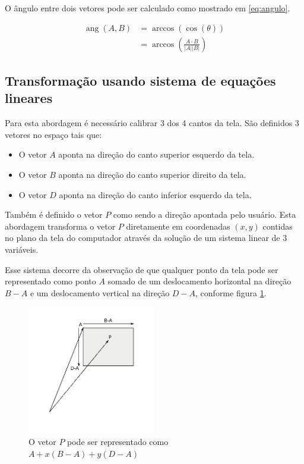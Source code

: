 \documentclass[brazil,pagestart=firstchapter]{abnt}
\DeclareMathOperator{\angulo}{ang}
\begin{document}
O ângulo entre dois vetores pode ser calculado como mostrado em
\eqref{eq:angulo}.

\begin{align}
\label{eq:angulo}
\angulo(A,B) & = \arccos( \cos(\theta) )    \\
             & = \arccos\left( \frac{A \cdot B}{|A||B|} \right)  \nonumber
\end{align}


\subsection{Transformação usando sistema de equações lineares}
\label{sub:coord_lineq}

Para esta abordagem é necessário calibrar 3 dos 4 cantos da tela. São
definidos 3 vetores no espaço tais que:

\begin{itemize}
\item O vetor $A$ aponta na direção do canto superior esquerdo da tela.
\item O vetor $B$ aponta na direção do canto superior direito da tela.
\item O vetor $D$ aponta na direção do canto inferior esquerdo da tela.
\end{itemize}

Também é definido o vetor $P$ como sendo a direção apontada pelo usuário.
Esta abordagem transforma o vetor $P$ diretamente em coordenadas $(x, y)$
contidas no plano da tela do computador através da solução de um sistema
linear de 3 variáveis.

Esse sistema decorre da observação de que qualquer ponto da tela pode ser
representado como ponto $A$ somado de um deslocamento horizontal na direção
$B-A$ e um deslocamento vertical na direção $D-A$, conforme figura
\ref{fig:lineq}.

\begin{figure}[h]
\centering
\includegraphics[width=0.5\textwidth]{img/lineq.pdf}
\caption{O vetor $P$ pode ser representado como $A + x(B-A) + y(D-A)$}
\label{fig:lineq}
\end{figure}
\end{document}
